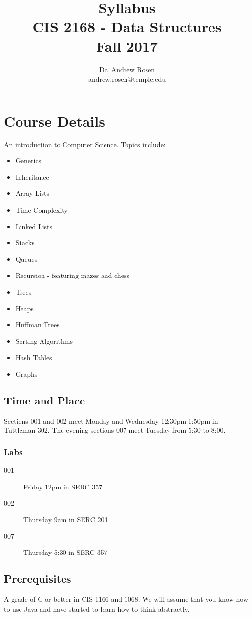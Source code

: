 \documentclass[10pt, letter]{article}
\title{Syllabus \\ CIS 2168 - Data Structures\\ Fall 2017}
\author{Dr. Andrew Rosen  \\ andrew.rosen@temple.edu}
\date{}
\begin{document}
\maketitle

\section{Course Details}

An introduction to Computer Science. Topics include:
\begin{itemize}
	\item Generics
	\item Inheritance
	\item Array Lists
	\item Time Complexity
	\item Linked Lists
	\item Stacks
	\item Queues
	\item Recursion - featuring mazes and chess
	\item Trees
	\item Heaps
	\item Huffman Trees
	\item Sorting Algorithms
	\item Hash Tables
	\item Graphs
\end{itemize}




\subsection*{Time and Place}
Sections 001 and 002 meet Monday and Wednesday 12:30pm-1:50pm in Tuttleman 302.
The evening sections 007 meet Tuesday from 5:30 to 8:00.


\subsubsection*{Labs}
\begin{description}
\item[001] Friday 12pm in SERC 357
\item[002] Thursday 9am in SERC 204
\item[007] Thursday 5:30 in SERC 357
\end{description}



\subsection*{Prerequisites}
A grade of C or better in CIS 1166 and 1068.
We will assume that you know how to use Java and have started to learn how to think abstractly.
\end{document}
